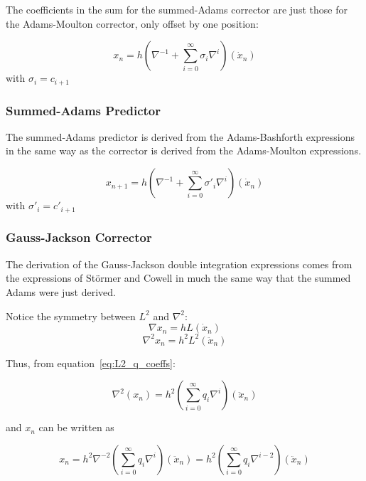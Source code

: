 The coefficients in the sum for the summed-Adams corrector are just
those for the Adams-Moulton corrector, only offset by one position:


\begin{equation} \label{eq:summed_adams_corrector}
x_{n}=h\left(\nabla ^{-1}+\sum _{i=0}^{\infty }\sigma
_{i}\nabla ^{i}\right)(\dot{x}_{n})
\end{equation}
with  $\sigma _{i}=c_{i+1}$

\subsubsection{Summed-Adams Predictor}

The summed-Adams predictor is derived from the Adams-Bashforth
expressions in the same way as the corrector is derived from the Adams-Moulton
expressions.


\begin{equation} \label{eq:summed_adams_predictor}
x_{n+1}=h\left(\nabla ^{-1}+\sum _{i=0}^{\infty }\sigma'_{i}\nabla ^{i}\right)
(\dot{x}_{n})
\end{equation}
with  $\sigma '_{i}=c'_{i+1}$

\subsubsection{Gauss-Jackson Corrector}

The derivation of the Gauss-Jackson double integration expressions comes
from the expressions of St\"ormer and Cowell in much the same way that
the summed Adams were just derived.

Notice the symmetry between
$L^2$ and $\nabla ^{2}$:
\begin{equation*}
 \nabla x_n = hL(\dot{x}_n)
\end{equation*}
\begin{equation*}
 \nabla^2 x_n = h^2L^2(\ddot{x}_n)
\end{equation*}

Thus, from equation~\ref{eq:L2_q_coeffs}:

\begin{equation*}
\nabla ^{2}(x_{n})=h^{2}\left(\sum _{i=0}^{\infty
}q_{i}\nabla ^{i}\right)({\ddot{x}}_{n})
\end{equation*}

and $x_{n}$ can be written as

\begin{equation*}
x_{n}= 
h^{2}\nabla ^{-2}\left(\sum _{i=0}^{\infty}q_{i}\nabla ^{i}\right)({\ddot{x}}_{n}) =
h^{2}\left(\sum _{i=0}^{\infty}q_{i}\nabla ^{i-2}\right)({\ddot{x}}_{n})
\end{equation*}

